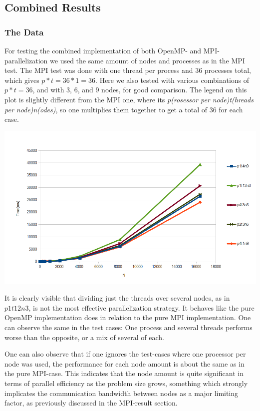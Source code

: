 \documentclass[fontsize=11pt,paper=a4,titlepage]{article}
\begin{document}
\subsection{Combined Results}
\subsubsection{The Data}

For testing the combined implementation of both OpenMP- and MPI-parallelization
we used the same amount of nodes and processes as in the MPI test. The MPI test
was done with one thread per process and 36 processes total, which gives $p*t =
36*1 = 36$. Here we also tested with various combinations of $p*t=36$, and with
3, 6, and 9 nodes, for good comparison. The legend on this plot is slightly
different from the MPI one, where its \emph{p(rosessor per node)t(hreads per
node)n(odes)}, so one multiplies them together to get a total of 36 for each
case.

\hspace*{-2.3cm}\includegraphics[scale=0.73]{pics/plot.png}

It is clearly visible that dividing just the threads over several nodes, as in
$p1t12n3$, is not the most effective parallelization strategy. It behaves like
the pure OpenMP implementation does in relation to the pure MPI implementation.
One can observe the same in the test cases: One process and several threads
performs worse than the opposite, or a mix of several of each.

One can also observe that if one ignores the test-cases where one processor per
node was used, the performance for each node amount is about the same as in the
pure MPI-case. This indicates that the node amount is quite significant in terms
of parallel efficiency as the problem size grows, something which strongly
implicates the communication bandwidth between nodes as a major limiting factor,
as previously discussed in the MPI-result section.
\end{document}
